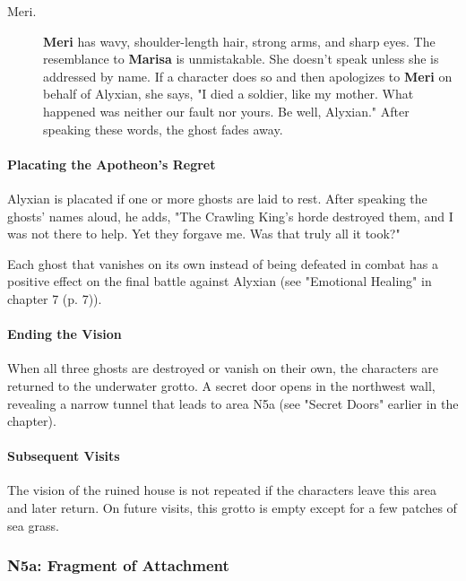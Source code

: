 \documentclass[letterpaper, 11pt, bg=full, twocolumn]{dndbook}
\begin{document}
\begin{description}
\item[Meri.] \textbf{Meri} has wavy, shoulder-length hair, strong arms, and sharp eyes. The resemblance to \textbf{Marisa} is unmistakable. She doesn't speak unless she is addressed by name. If a character does so and then apologizes to \textbf{Meri} on behalf of Alyxian, she says, "I died a soldier, like my mother. What happened was neither our fault nor yours. Be well, Alyxian." After speaking these words, the ghost fades away.
\end{description}


\paragraph{Placating the Apotheon's Regret}

Alyxian is placated if one or more ghosts are laid to rest. After speaking the ghosts' names aloud, he adds, "The Crawling King's horde destroyed them, and I was not there to help. Yet they forgave me. Was that truly all it took?"

Each ghost that vanishes on its own instead of being defeated in combat has a positive effect on the final battle against Alyxian (see "Emotional Healing" in chapter 7 (p. 7)).

\paragraph{Ending the Vision}

When all three ghosts are destroyed or vanish on their own, the characters are returned to the underwater grotto. A secret door opens in the northwest wall, revealing a narrow tunnel that leads to area N5a (see "Secret Doors" earlier in the chapter).

\paragraph{Subsequent Visits}

The vision of the ruined house is not repeated if the characters leave this area and later return. On future visits, this grotto is empty except for a few patches of sea grass.

\subsubsection{N5a: Fragment of Attachment}
\end{document}
